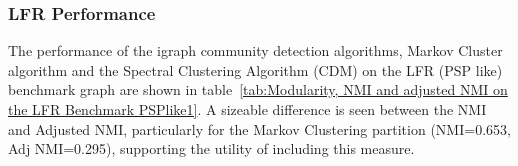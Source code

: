 









\subsubsection{LFR Performance}
\label{sec:lfrbm}
The performance of the igraph community detection algorithms, Markov Cluster algorithm and the Spectral Clustering Algorithm (CDM)\cite{mclean2016improved} on the LFR (PSP like) benchmark graph are shown in table~\ref{tab:Modularity, NMI and adjusted NMI on the LFR Benchmark PSPlike1}. A sizeable difference is seen between the NMI and Adjusted NMI, particularly for the Markov Clustering partition (NMI=0.653, Adj NMI=0.295), supporting the utility of including this measure\cite{vinh2010information}. 


